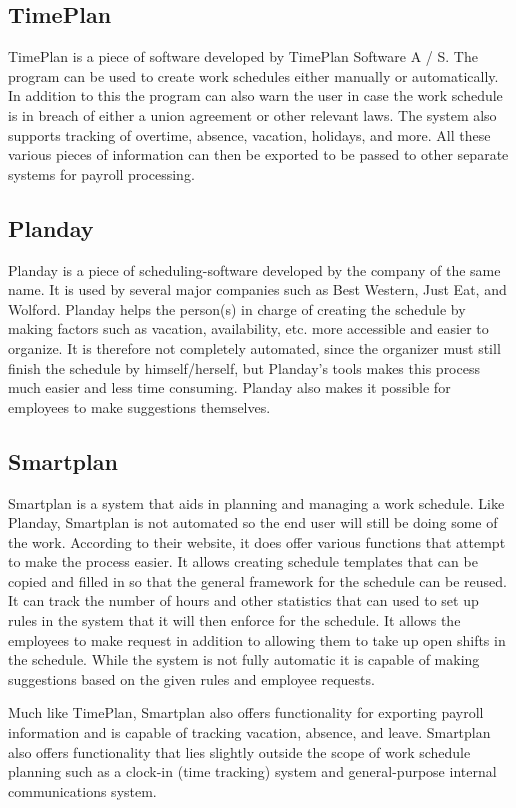 \subsection{TimePlan}
TimePlan is a piece of software developed by TimePlan Software A / S. The program can be used to create work schedules either manually or automatically. In addition to this the program can also warn the user in case the work schedule is in breach of either a union agreement or other relevant laws. The system also supports tracking of overtime, absence, vacation, holidays, and more. All these various pieces of information can then be exported to be passed to other separate systems for payroll processing. \parencite{TimePlan}

\subsection{Planday}
Planday is a piece of scheduling-software developed by the company of the same name. It is used by several major companies such as Best Western, Just Eat, and Wolford. Planday helps the person(s) in charge of creating the schedule by making factors such as vacation, availability, etc. more accessible and easier to organize. It is therefore not completely automated, since the organizer must still finish the schedule by himself/herself, but Planday's tools makes this process much easier and less time consuming. Planday also makes it possible for employees to make suggestions themselves. \parencite{planday}

\subsection{Smartplan}
Smartplan is a system that aids in planning and managing a work schedule. Like Planday, Smartplan is not automated so the end user will still be doing some of the work. According to their website, it does offer various functions that attempt to make the process easier. It allows creating schedule templates that can be copied and filled in so that the general framework for the schedule can be reused.
It can track the number of hours and other statistics that can used to set up rules in the system that it will then enforce for the schedule. It allows the employees to make request in addition to allowing them to take up open shifts in the schedule. While the system is not fully automatic it is capable of making suggestions based on the given rules and employee requests.

Much like TimePlan, Smartplan also offers functionality for exporting payroll information and is capable of tracking vacation, absence, and leave. Smartplan also offers functionality that lies slightly outside the scope of work schedule planning such as a clock-in (time tracking) system and general-purpose internal communications system. \parencite{smartplan}


